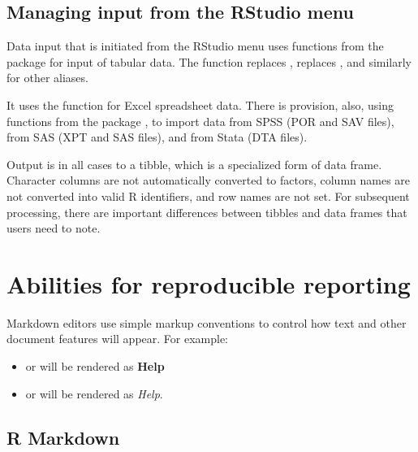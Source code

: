 \subsection{Managing input from the RStudio menu}\label{ss:readEtc}

Data input that is initiated from the RStudio menu uses functions
from the package  for input of tabular data.
The function  replaces
,  replaces
, and similarly for other 
aliases.

It uses the function  for Excel
spreadsheet data. There is provision, also, using functions from
the package , to import data from SPSS (POR and
SAV files), from SAS (XPT and SAS files), and from Stata (DTA
files).  

Output is in all cases to a tibble, which is a specialized form
of data frame. 
Character columns are not automatically converted to factors,
column names are not converted into valid R identifiers, and row
names are not set.  For subsequent processing, there are
important differences between tibbles and data frames that users
need to note.

\section{Abilities for reproducible reporting}
Markdown editors use simple markup conventions to control how text and
other document features will appear.  For example:
\begin{itemize}
\item[]  or  will be rendered as
\textbf{Help}
\item[]  or  will be rendered as {\em Help}.
\end{itemize}

\subsection{R Markdown}


